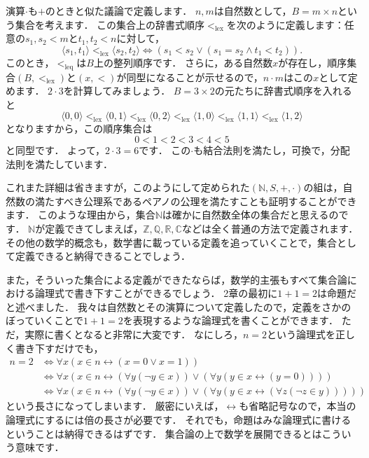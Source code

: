 \documentclass[./main]{subfiles}
\newcommand{\mbb}{\mathbb}
\begin{document}
演算$\cdot$も$+$のときと似た議論で定義します．
$n, m$は自然数として，$B=m\times n$という集合を考えます．
この集合上の辞書式順序$<_{\text{lex}}$を次のように定義します：任意の$s_1, s_2 < m$と$t_1, t_2 < n$に対して，
\[
\langle s_1, t_1\rangle <_{\text{lex}}\langle s_2, t_2\rangle\iff (s_1 < s_2 \lor (s_1 = s_2 \land t_1 < t_2)).
\]
このとき，$<_{\text{leq}}$は$B$上の整列順序です．
さらに，ある自然数$x$が存在し，順序集合$(B, <_{\text{lex}})$と$(x, <)$が同型になることが示せるので，$n\cdot m$はこの$x$として定めます．
$2\cdot 3$を計算してみましょう．
$B=3\times 2$の元たちに辞書式順序を入れると
\[
\langle 0, 0\rangle <_{\text{lex}} \langle 0, 1\rangle <_{\text{lex}} \langle 0, 2\rangle <_{\text{lex}} \langle 1, 0 \rangle <_{\text{lex}} \langle 1, 1\rangle <_{\text{lex}} \langle 1, 2\rangle
\]
となりますから，この順序集合は
\[
0<1<2<3<4<5
\]
と同型です．
よって，$2\cdot 3 = 6$です．
この$\cdot$も結合法則を満たし，可換で，分配法則を満たしています．

これまた詳細は省きますが，このようにして定められた$(\mbb{N}, S, +, \cdot)$の組は，自然数の満たすべき公理系であるペアノの公理を満たすことも証明することができます．
このような理由から，集合$\mbb{N}$は確かに自然数全体の集合だと思えるのです．
$\mbb{N}$が定義できてしまえば，$\mbb{Z}, \mbb{Q}, \mbb{R}, \mbb{C}$などは全く普通の方法で定義されます．
その他の数学的概念も，数学書に載っている定義を追っていくことで，集合として定義できると納得できることでしょう．

また，そういった集合による定義ができたならば，数学的主張もすべて集合論における論理式で書き下すことができるでしょう．
2章の最初に$1+1=2$は命題だと述べました．
我々は自然数とその演算について定義したので，定義をさかのぼっていくことで$1+1=2$を表現するような論理式を書くことができます．
ただ，実際に書くとなると非常に大変です．
なにしろ，$n=2$という論理式を正しく書き下すだけでも，
\begin{align*}
n=2 &\iff \forall x(x\in n\leftrightarrow (x=0 \lor x=1))\\
&\iff \forall x(x\in n\leftrightarrow (\forall y(\neg y\in x))\lor (\forall y(y\in x\leftrightarrow (y = 0))))\\
&\iff \forall x(x\in n\leftrightarrow (\forall y(\neg y\in x))\lor (\forall y(y\in x\leftrightarrow (\forall z(\neg z\in y)))))
\end{align*}
という長さになってしまいます．
厳密にいえば，$\leftrightarrow$も省略記号なので，本当の論理式にするには倍の長さが必要です．
それでも，命題はみな論理式に書けるということは納得できるはずです．
集合論の上で数学を展開できるとはこういう意味です．
\end{document}
